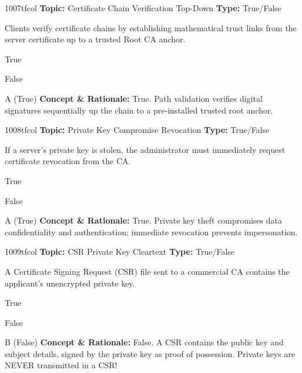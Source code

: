 \begin{qcard}{1007}{tfcol}
\textcolor{darkslate!75}{\small\textbf{Topic:} Certificate Chain Verification Top-Down \hfill \textbf{Type:} True/False}\vspace{0.4em}\par
Clients verify certificate chains by establishing mathematical trust links from the server certificate up to a trusted Root CA anchor.
\begin{qoptions}
\item True
\item False
\end{qoptions}
\end{qcard}
\nopagebreak
\begin{explainbox}{A (True)}
\textbf{Concept \& Rationale:} True. Path validation verifies digital signatures sequentially up the chain to a pre-installed trusted root anchor.
\end{explainbox}

\begin{qcard}{1008}{tfcol}
\textcolor{darkslate!75}{\small\textbf{Topic:} Private Key Compromise Revocation \hfill \textbf{Type:} True/False}\vspace{0.4em}\par
If a server's private key is stolen, the administrator must immediately request certificate revocation from the CA.
\begin{qoptions}
\item True
\item False
\end{qoptions}
\end{qcard}
\nopagebreak
\begin{explainbox}{A (True)}
\textbf{Concept \& Rationale:} True. Private key theft compromises data confidentiality and authentication; immediate revocation prevents impersonation.
\end{explainbox}

\begin{qcard}{1009}{tfcol}
\textcolor{darkslate!75}{\small\textbf{Topic:} CSR Private Key Cleartext \hfill \textbf{Type:} True/False}\vspace{0.4em}\par
A Certificate Signing Request (CSR) file sent to a commercial CA contains the applicant's unencrypted private key.
\begin{qoptions}
\item True
\item False
\end{qoptions}
\end{qcard}
\nopagebreak
\begin{explainbox}{B (False)}
\textbf{Concept \& Rationale:} False. A CSR contains the public key and subject details, signed by the private key as proof of possession. Private keys are NEVER transmitted in a CSR!
\end{explainbox}

